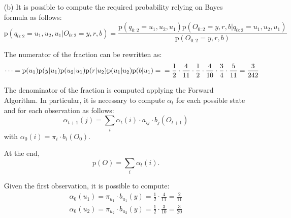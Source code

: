 {\begin{itemize}
\begin{itemize}
			\item[-] Observation probabilities are given in the matrix $B$. 
			In particular, the probability of observing $m$ is given by 
			$b_i(m)=\mathrm{P}(O_t=v_m|q_t=s_i)$, with $1 \leq i \leq N$ and 
			$1 \leq j \leq M$
			
			\begin{equation*}
			B = 
			\left[\begin{matrix}
			\dfrac{5}{11} & \dfrac{2}{11} & \dfrac{4}{11}\\[15pt]
			\dfrac{3}{10} & \dfrac{4}{10} & \dfrac{3}{10} 
			\end{matrix}\right]
			\mbox{.}
			\end{equation*}
			
				
		\end{itemize}
		\item[(b)] It is possible to compute the required probability relying 
		on Bayes formula as follows:
		\begin{equation*}
			\mathrm{p}(q_{0:2}=u_1,u_2, u_1 | O_{0:2}=y,r,b) = 
			\frac{\mathrm{p}(q_{0:2}=u_1,u_2, u_1)\mathrm{p}(O_{0:2}=y,r,b | 
			q_{0:2}=u_1,u_2, u_1)}{\mathrm{p}(O_{0:2}=y,r,b)}
		\end{equation*}
		
		The numerator of the fraction can be rewritten as:
		\begin{equation*}
			\dots = \mathrm{p}(u_1) \mathrm{p}(y|u_1) 
			\mathrm{p}(u_2|u_1) \mathrm{p}(r|u_2) \mathrm{p}(u_1|u_2) 
			\mathrm{p}(b|u_1) = \\
			= \frac{1}{2} \cdot \frac{4}{11} \cdot \frac{1}{2} \cdot 
			\frac{4}{10} \cdot \frac{3}{4} \cdot \frac{5}{11} = \frac{3}{242}
		\end{equation*}
		
		The denominator of the fraction is computed applying the Forward 
		Algorithm. In particular, it is necessary to compute $\alpha_t$ for 
		each possible state and for each observation as follows:
		\begin{equation*}
			\alpha_{t+1}(j) = \sum_i \alpha_t(i) \cdot a_{ij} \cdot b_j(O_{t+1})
		\end{equation*}
		with $\alpha_0(i) = \pi_i \cdot b_i(O_0)$.
		
		At the end, 		
		\begin{equation*}
		\mathrm{p}(O) = \sum_i \alpha_t(i) \mbox{.}
		\end{equation*}
		
		Given the first observation, it is possible to compute:
		\begin{align*}
			\alpha_0(u_1) = \pi_{u_1} \cdot b_{u_1}(y) = \frac{1}{2} \cdot 
			\frac{4}{11} = \frac{2}{11}\\
			\alpha_0(u_2) = \pi_{u_2} \cdot b_{u_2}(y) = \frac{1}{2} \cdot 
			\frac{3}{10} = \frac{3}{20}
		\end{align*}
		

\end{itemize}}
